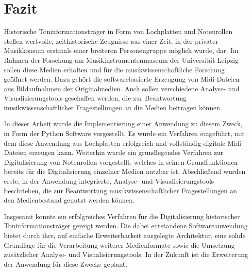 \section{Fazit}

Historische Toninformationsträger in Form von Lochplatten und Notenrollen stellen wertvolle, zeithistorische Zeugnisse aus einer Zeit, in der privater Musikkonsum erstmals einer breiteren Personengruppe möglich wurde, dar.
Im Rahmen der Forschung am Musikinstrumentenmuseum der Universität Leipzig sollen diese Medien erhalten und für die musikwissenschaftliche Forschung geöffnet werden.
Dazu gehört die softwarebasierte Erzeugung von Midi-Dateien aus Bildaufnahmen der Originalmedien.
Auch sollen verschiedene Analyse- und Visualisierungstools geschaffen werden, die zur Beantwortung musikwissenschaftlicher Fragestellungen an die Medien beitragen können.

In dieser Arbeit wurde die Implementierung einer Anwendung zu diesem Zweck, in Form der Python Software  vorgestellt.
Es wurde ein Verfahren eingeführt, mit dem diese Anwendung aus Lochplatten erfolgreich und vollständig digitale Midi-Dateien erzeugen kann.
Weiterhin wurde ein grundlegendes Verfahren zur Digitalisierung von Notenrollen vorgestellt, welches in seinen Grundfunktionen bereits für die Digitalisierung einzelner Medien nutzbar ist.
Abschließend wurden erste, in der Anwendung integrierte, Analyse- und Visualisierungstools beschrieben, die zur Beantwortung musikwissenschaftlicher Fragestellungen an den Medienbestand genutzt werden können.

Insgesamt konnte ein erfolgreiches Verfahren für die Digitalisierung historischer Toninformationsträger gezeigt werden.
Die dabei entstandene Softwareanwendung bietet durch ihre, auf einfache Erweiterbarkeit ausgelegte Architektur, eine solide Grundlage für die Verarbeitung weiterer Medienformate sowie die Umsetzung zusätzlicher Analyse- und Visualisierungstools.
In der Zukunft ist die Erweiterung der Anwendung für diese Zwecke geplant.